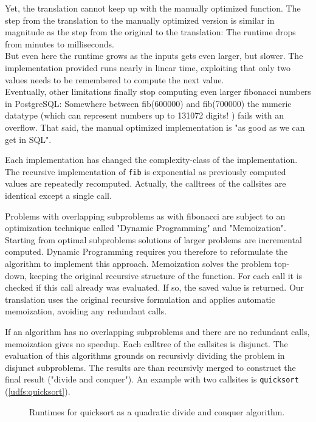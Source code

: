 Yet, the translation cannot keep up with the manually optimized function. The step from the translation to the manually optimized version is similar in magnitude as the step from the original to the translation: The runtime drops from minutes to milliseconds.\\
But even here the runtime grows as the inputs gets even larger, but slower. The implementation provided runs nearly in linear time, exploiting that only two values needs to be remembered to compute the next value.\\

Eventually, other limitations finally stop computing even larger fibonacci numbers in PostgreSQL: Somewhere between fib(600000) and fib(700000) the numeric datatype (which can represent numbers up to 131072 digits! \cite[p. 124 f.]{psql}) fails with an overflow. That said, the manual optimized implementation is "as good as we can get in SQL".

Each implementation has changed the complexity-class of the implementation. The recursive implementation of \texttt{fib} is exponential \cite{} as previously computed values are repeatedly recomputed. Actually, the calltrees of the callsites are identical except a single call.

Problems with overlapping subproblems as with fibonacci are subject to an optimization technique called "Dynamic Programming" and "Memoization". Starting from optimal subproblems solutions of larger problems are incremental computed. Dynamic Programming requires you therefore to reformulate the algorithm to implement this approach. Memoization solves the problem top-down, keeping the original recursive structure of the function. For each call it is checked if this call already was evaluated. If so, the saved value is returned. Our translation uses the original recursive formulation and applies automatic memoization, avoiding any redundant calls.

If an algorithm has no overlapping subproblems and there are no redundant calls, memoization gives no speedup. Each calltree of the callsites is disjunct. The evaluation of this algorithms grounds on recursivly dividing the problem in disjunct subproblems. The results are than recursivly merged to construct the final result ("divide and conquer"). An example with two callsites is \texttt{quicksort} (\autoref{udfs:quicksort}).

\begin{figure}[h!]
    \centering
    
    \caption{Runtimes for quicksort as a quadratic divide and conquer algorithm.}
    \label{fig:nonoverlapping_times}
\end{figure}

